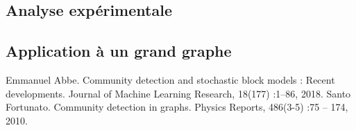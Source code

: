\documentclass[11pt]{article}
\begin{document}
\newpage
\subsection{Analyse expérimentale}


\subsection{Application à un grand graphe}


\newpage
\begin{thebibliography}{widest entry}
  \bibitem[Abb18]{} Emmanuel Abbe. Community detection and stochastic block models : Recent developments. Journal of Machine Learning Research, 18(177) :1–86, 2018.
  \bibitem[For10]{} Santo Fortunato. Community detection in graphs. Physics Reports, 486(3-5) :75 – 174, 2010.
\end{thebibliography}
  
\end{document}
